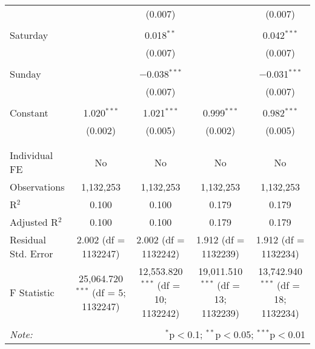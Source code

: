 \documentclass[
]{article}
\begin{document}
\begin{table}[!htbp]
{\begin{tabular}{@{\extracolsep{5pt}}lcccc}
  &  & (0.007) &  & (0.007) \\ 
  & & & & \\ 
 Saturday &  & 0.018$^{**}$ &  & 0.042$^{***}$ \\ 
  &  & (0.007) &  & (0.007) \\ 
  & & & & \\ 
 Sunday &  & $-$0.038$^{***}$ &  & $-$0.031$^{***}$ \\ 
  &  & (0.007) &  & (0.007) \\ 
  & & & & \\ 
 Constant & 1.020$^{***}$ & 1.021$^{***}$ & 0.999$^{***}$ & 0.982$^{***}$ \\ 
  & (0.002) & (0.005) & (0.002) & (0.005) \\ 
  & & & & \\ 
\hline \\[-1.8ex] 
Individual FE & No & No & No & No \\ 
Observations & 1,132,253 & 1,132,253 & 1,132,253 & 1,132,253 \\ 
R$^{2}$ & 0.100 & 0.100 & 0.179 & 0.179 \\ 
Adjusted R$^{2}$ & 0.100 & 0.100 & 0.179 & 0.179 \\ 
Residual Std. Error & 2.002 (df = 1132247) & 2.002 (df = 1132242) & 1.912 (df = 1132239) & 1.912 (df = 1132234) \\ 
F Statistic & 25,064.720$^{***}$ (df = 5; 1132247) & 12,553.820$^{***}$ (df = 10; 1132242) & 19,011.510$^{***}$ (df = 13; 1132239) & 13,742.940$^{***}$ (df = 18; 1132234) \\ 
\hline 
\hline \\[-1.8ex] 
\textit{Note:}  & \multicolumn{4}{r}{$^{*}$p$<$0.1; $^{**}$p$<$0.05; $^{***}$p$<$0.01} \\ 
\end{tabular}
} 
\end{table} 
\newpage
\end{document}

